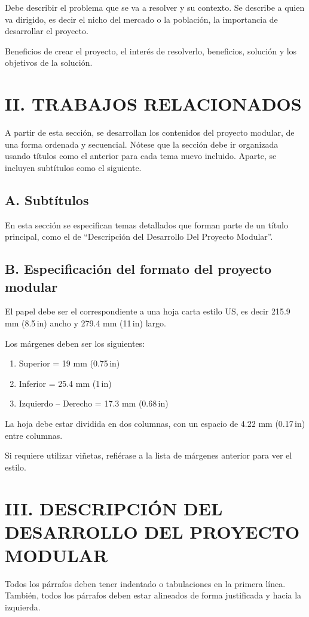 ﻿\documentclass[10pt,twocolumn]{article}
\begin{document}
Debe describir el problema que se va a resolver y su contexto. Se describe a quien va dirigido, es decir el nicho del mercado o la población, la importancia de desarrollar el proyecto.

Beneficios de crear el proyecto, el interés de resolverlo, beneficios, solución y los objetivos de la solución.

\section*{II. TRABAJOS RELACIONADOS}
A partir de esta sección, se desarrollan los contenidos del proyecto modular, de una forma ordenada y secuencial. Nótese que la sección debe ir organizada usando títulos como el anterior para cada tema nuevo incluido. Aparte, se incluyen subtítulos como el siguiente.

\subsection*{A. Subtítulos}
En esta sección se especifican temas detallados que forman parte de un título principal, como el de “Descripción del Desarrollo Del Proyecto Modular”.

\subsection*{B. Especificación del formato del proyecto modular}
El papel debe ser el correspondiente a una hoja carta estilo US, es decir 215.9 mm (8.5\,in) ancho y 279.4 mm (11\,in) largo.

Los márgenes deben ser los siguientes:
\begin{enumerate}[leftmargin=*,label=\arabic*.]
  \item Superior = 19 mm (0.75\,in)
  \item Inferior = 25.4 mm (1\,in)
  \item Izquierdo -- Derecho = 17.3 mm (0.68\,in)
\end{enumerate}

La hoja debe estar dividida en dos columnas, con un espacio de 4.22 mm (0.17\,in) entre columnas.

Si requiere utilizar viñetas, refiérase a la lista de márgenes anterior para ver el estilo.

\section*{III. DESCRIPCIÓN DEL DESARROLLO DEL PROYECTO MODULAR}
Todos los párrafos deben tener indentado o tabulaciones en la primera línea. También, todos los párrafos deben estar alineados de forma justificada y hacia la izquierda.
\end{document}
